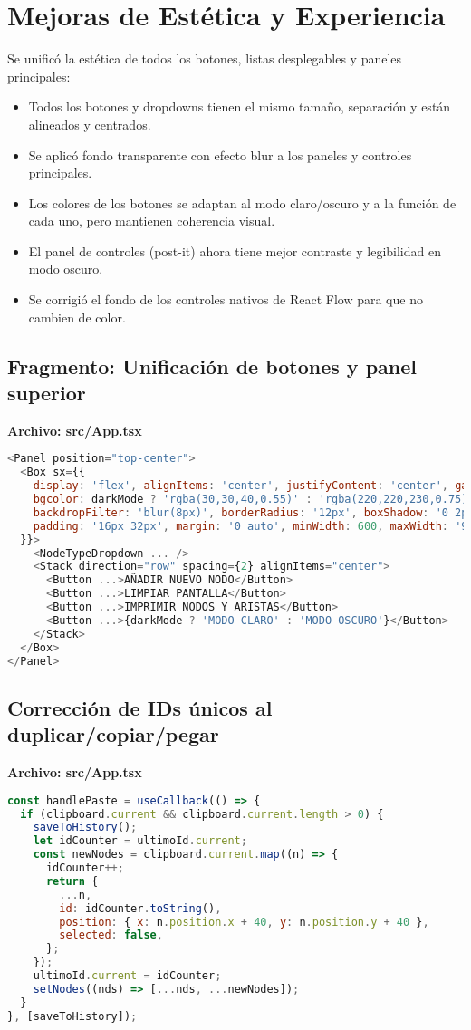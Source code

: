 \documentclass{article}
\begin{document}
\section*{Mejoras de Estética y Experiencia}
Se unificó la estética de todos los botones, listas desplegables y paneles principales:
\begin{itemize}
    \item Todos los botones y dropdowns tienen el mismo tamaño, separación y están alineados y centrados.
    \item Se aplicó fondo transparente con efecto blur a los paneles y controles principales.
    \item Los colores de los botones se adaptan al modo claro/oscuro y a la función de cada uno, pero mantienen coherencia visual.
    \item El panel de controles (post-it) ahora tiene mejor contraste y legibilidad en modo oscuro.
    \item Se corrigió el fondo de los controles nativos de React Flow para que no cambien de color.
\end{itemize}

\subsection*{Fragmento: Unificación de botones y panel superior}
\textbf{Archivo: src/App.tsx}
\begin{lstlisting}[language=JavaScript, caption=Panel superior con botones unificados]
<Panel position="top-center">
  <Box sx={{
    display: 'flex', alignItems: 'center', justifyContent: 'center', gap: 2,
    bgcolor: darkMode ? 'rgba(30,30,40,0.55)' : 'rgba(220,220,230,0.75)',
    backdropFilter: 'blur(8px)', borderRadius: '12px', boxShadow: '0 2px 12px rgba(0,0,0,0.10)',
    padding: '16px 32px', margin: '0 auto', minWidth: 600, maxWidth: '90vw',
  }}>
    <NodeTypeDropdown ... />
    <Stack direction="row" spacing={2} alignItems="center">
      <Button ...>AÑADIR NUEVO NODO</Button>
      <Button ...>LIMPIAR PANTALLA</Button>
      <Button ...>IMPRIMIR NODOS Y ARISTAS</Button>
      <Button ...>{darkMode ? 'MODO CLARO' : 'MODO OSCURO'}</Button>
    </Stack>
  </Box>
</Panel>
\end{lstlisting}

\subsection*{Corrección de IDs únicos al duplicar/copiar/pegar}
\textbf{Archivo: src/App.tsx}
\begin{lstlisting}[language=JavaScript, caption=IDs únicos en duplicado y pegado]
const handlePaste = useCallback(() => {
  if (clipboard.current && clipboard.current.length > 0) {
    saveToHistory();
    let idCounter = ultimoId.current;
    const newNodes = clipboard.current.map((n) => {
      idCounter++;
      return {
        ...n,
        id: idCounter.toString(),
        position: { x: n.position.x + 40, y: n.position.y + 40 },
        selected: false,
      };
    });
    ultimoId.current = idCounter;
    setNodes((nds) => [...nds, ...newNodes]);
  }
}, [saveToHistory]);
\end{lstlisting}
\end{document}
